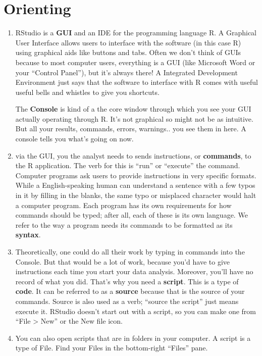 \documentclass[
]{book}
\theoremstyle{definition}
\theoremstyle{definition}
\theoremstyle{definition}
\theoremstyle{definition}
\theoremstyle{remark}
\begin{document}
\hypertarget{orienting}{%
\section{Orienting}\label{orienting}}

\begin{enumerate}
\def\labelenumi{\arabic{enumi}.}
\item
  RStudio is a \textbf{GUI} and an IDE for the programming language R. A Graphical User Interface allows users to interface with the software (in this case R) using graphical aids like buttons and tabs. Often we don't think of GUIs because to most computer users, everything is a GUI (like Microsoft Word or your ``Control Panel''), but it's always there! A Integrated Development Environment just says that the software to interface with R comes with useful useful bells and whistles to give you shortcuts.

  The \textbf{Console} is kind of a the core window through which you see your GUI actually operating through R. It's not graphical so might not be as intuitive. But all your results, commands, errors, warnings.. you see them in here. A console tells you what's going on now.
\item
  via the GUI, you the analyst needs to sends instructions, or \textbf{commands}, to the R application. The verb for this is ``run'' or ``execute'' the command. Computer programs ask users to provide instructions in very specific formats. While a English-speaking human can understand a sentence with a few typos in it by filling in the blanks, the same typo or misplaced character would halt a computer program. Each program has its own requirements for how commands should be typed; after all, each of these is its own language. We refer to the way a program needs its commands to be formatted as its \textbf{syntax}.
\item
  Theoretically, one could do all their work by typing in commands into the Console. But that would be a lot of work, because you'd have to give instructions each time you start your data analysis. Moreover, you'll have no record of what you did. That's why you need a \textbf{script}. This is a type of \textbf{code}. It can be referred to as a \textbf{source} because that is the source of your commands. Source is also used as a verb; ``source the script'' just means execute it. RStudio doesn't start out with a script, so you can make one from ``File \textgreater{} New'' or the New file icon.
\item
  You can also open scripts that are in folders in your computer. A script is a type of File. Find your Files in the bottom-right ``Files'' pane.


\end{enumerate}
\end{document}
